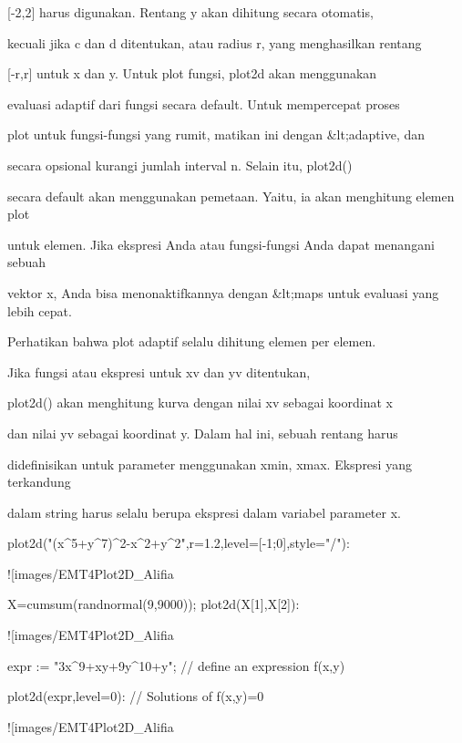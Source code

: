 \documentclass{article}
\begin{document}
[-2,2] harus digunakan. Rentang y akan dihitung secara otomatis,


kecuali jika c dan d ditentukan, atau radius r, yang menghasilkan
rentang


[-r,r] untuk x dan y. Untuk plot fungsi, plot2d akan menggunakan


evaluasi adaptif dari fungsi secara default. Untuk mempercepat proses


plot untuk fungsi-fungsi yang rumit, matikan ini dengan &lt;adaptive, dan


secara opsional kurangi jumlah interval n. Selain itu, plot2d()


secara default akan menggunakan pemetaan. Yaitu, ia akan menghitung
elemen plot


untuk elemen. Jika ekspresi Anda atau fungsi-fungsi Anda dapat
menangani sebuah


vektor x, Anda bisa menonaktifkannya dengan &lt;maps untuk evaluasi yang
lebih cepat.


 Perhatikan bahwa plot adaptif selalu dihitung elemen per elemen.  



Jika fungsi atau ekspresi untuk xv dan yv ditentukan,


plot2d() akan menghitung kurva dengan nilai xv sebagai koordinat x


dan nilai yv sebagai koordinat y. Dalam hal ini, sebuah rentang harus


didefinisikan untuk parameter menggunakan xmin, xmax. Ekspresi yang
terkandung


dalam string harus selalu berupa ekspresi dalam variabel parameter x.


\>plot2d("(x^5+y^7)^2-x^2+y^2",r=1.2,level=[-1;0],style="/"):


![images/EMT4Plot2D_Alifia%

\>X=cumsum(randnormal(9,9000)); plot2d(X[1],X[2]):


![images/EMT4Plot2D_Alifia%

\>expr := "3\*x^9+x\*y+9\*y^10+y"; // define an expression f(x,y)

\>plot2d(expr,level=0): // Solutions of f(x,y)=0


![images/EMT4Plot2D_Alifia%
\end{document}
